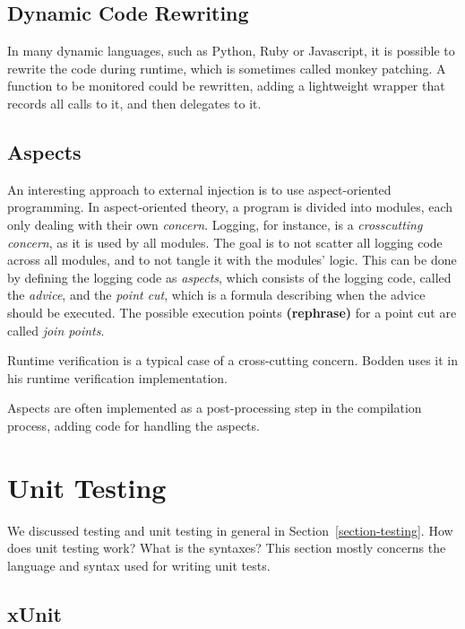 \documentclass[a4paper,11pt]{kth-mag}
\newcommand{\rephrase}{\textbf{(rephrase)} }
\begin{document}
\subsection{Dynamic Code Rewriting}

In many dynamic languages, such as Python, Ruby or Javascript, it is possible
to rewrite the code during runtime, which is sometimes called monkey patching.
A function to be monitored could be rewritten, adding a lightweight wrapper
that records all calls to it, and then delegates to it.


\subsection{Aspects}

An interesting approach to external injection is to use aspect-oriented
programming. In aspect-oriented theory, a program is divided into modules, each
only dealing with their own \textit{concern}. Logging, for instance, is a
\textit{crosscutting concern}, as it is used by all modules. The goal is to not
scatter all logging code across all modules, and to not tangle it with the
modules' logic. This can be done by defining the logging code as
\textit{aspects}, which consists of the logging code, called the
\textit{advice}, and the \textit{point cut}, which is a formula describing when
the advice should be executed. The possible execution points \rephrase for a
point cut are called \textit{join points}.

Runtime verification is a typical case of a cross-cutting concern. Bodden
\cite{bodden05efficientrv} uses it in his runtime verification implementation.

Aspects are often implemented as a post-processing step in the compilation
process, adding code for handling the aspects.


\section{Unit Testing} \label{section-unit-testing}

We discussed testing and unit testing in general in
Section~\ref{section-testing}. How does unit testing work? What is the
syntaxes? This section mostly concerns the language and syntax used for writing
unit tests.

\subsection{xUnit}
\end{document}
